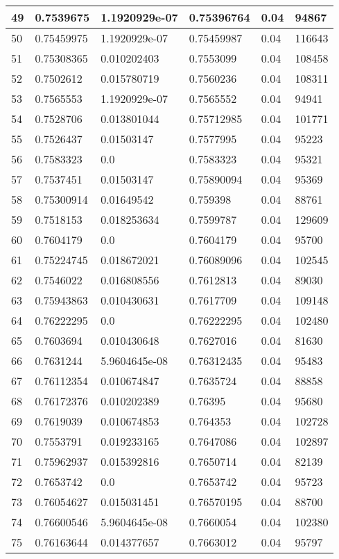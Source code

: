 \begin{longtable}{|l|l|l|l|l|l|}
49 & 0.7539675 & 1.1920929e-07 & 0.75396764 & 0.04 & 94867 \\ \hline 
50 & 0.75459975 & 1.1920929e-07 & 0.75459987 & 0.04 & 116643 \\ \hline 
51 & 0.75308365 & 0.010202403 & 0.7553099 & 0.04 & 108458 \\ \hline 
52 & 0.7502612 & 0.015780719 & 0.7560236 & 0.04 & 108311 \\ \hline 
53 & 0.7565553 & 1.1920929e-07 & 0.7565552 & 0.04 & 94941 \\ \hline 
54 & 0.7528706 & 0.013801044 & 0.75712985 & 0.04 & 101771 \\ \hline 
55 & 0.7526437 & 0.01503147 & 0.7577995 & 0.04 & 95223 \\ \hline 
56 & 0.7583323 & 0.0 & 0.7583323 & 0.04 & 95321 \\ \hline 
57 & 0.7537451 & 0.01503147 & 0.75890094 & 0.04 & 95369 \\ \hline 
58 & 0.75300914 & 0.01649542 & 0.759398 & 0.04 & 88761 \\ \hline 
59 & 0.7518153 & 0.018253634 & 0.7599787 & 0.04 & 129609 \\ \hline 
60 & 0.7604179 & 0.0 & 0.7604179 & 0.04 & 95700 \\ \hline 
61 & 0.75224745 & 0.018672021 & 0.76089096 & 0.04 & 102545 \\ \hline 
62 & 0.7546022 & 0.016808556 & 0.7612813 & 0.04 & 89030 \\ \hline 
63 & 0.75943863 & 0.010430631 & 0.7617709 & 0.04 & 109148 \\ \hline 
64 & 0.76222295 & 0.0 & 0.76222295 & 0.04 & 102480 \\ \hline 
65 & 0.7603694 & 0.010430648 & 0.7627016 & 0.04 & 81630 \\ \hline 
66 & 0.7631244 & 5.9604645e-08 & 0.76312435 & 0.04 & 95483 \\ \hline 
67 & 0.76112354 & 0.010674847 & 0.7635724 & 0.04 & 88858 \\ \hline 
68 & 0.76172376 & 0.010202389 & 0.76395 & 0.04 & 95680 \\ \hline 
69 & 0.7619039 & 0.010674853 & 0.764353 & 0.04 & 102728 \\ \hline 
70 & 0.7553791 & 0.019233165 & 0.7647086 & 0.04 & 102897 \\ \hline 
71 & 0.75962937 & 0.015392816 & 0.7650714 & 0.04 & 82139 \\ \hline 
72 & 0.7653742 & 0.0 & 0.7653742 & 0.04 & 95723 \\ \hline 
73 & 0.76054627 & 0.015031451 & 0.76570195 & 0.04 & 88700 \\ \hline 
74 & 0.76600546 & 5.9604645e-08 & 0.7660054 & 0.04 & 102380 \\ \hline 
75 & 0.76163644 & 0.014377657 & 0.7663012 & 0.04 & 95797 \\ \hline 
\end{longtable}